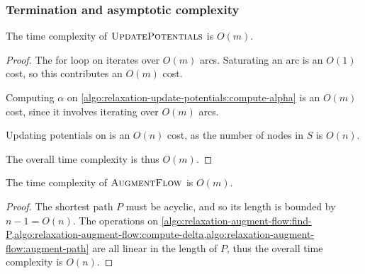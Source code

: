 \subsubsection{Termination and asymptotic complexity}

\begin{lemma} \label{lemma:relax-complexity-updatepotentials}
The time complexity of $\textproc{UpdatePotentials}$ is $O(m)$.
\end{lemma}
\begin{proof}
The for loop on  iterates over $O(m)$ arcs. Saturating an arc is an $O(1)$ cost, so this contributes an $O(m)$ cost.

Computing $\alpha$ on \cref{algo:relaxation-update-potentials:compute-alpha} is an $O(m)$ cost, since it involves iterating over $O(m)$ arcs.

Updating potentials on  is an $O(n)$ cost, as the number of nodes in $S$ is $O(n)$.

The overall time complexity is thus $O(m)$.
\end{proof}

\begin{lemma} \label{lemma:relax-complexity-augmentflow}
The time complexity of $\textproc{AugmentFlow}$ is $O(m)$.
\end{lemma}
\begin{proof}
The shortest path $P$ must be acyclic, and so its length is bounded by $n-1=O(n)$. The operations on \cref{algo:relaxation-augment-flow:find-P,algo:relaxation-augment-flow:compute-delta,algo:relaxation-augment-flow:augment-path} are all linear in the length of $P$, thus the overall time complexity is $O(n)$.
\end{proof}

